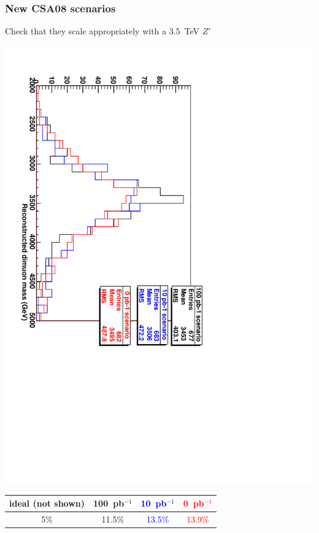 \documentclass[compress]{beamer}
\begin{document}
\begin{frame}
\frametitle{New CSA08 scenarios}

\vspace{0.5 cm}
Check that they scale appropriately with a 3.5~TeV $Z'$

\begin{center}
\includegraphics[height=0.8\linewidth, angle=90]{newscenarios_zprimetest.pdf}

\vspace{0.5 cm}
\begin{tabular}{c c c c}
ideal (not shown) & 100~pb$^{-1}$ & \textcolor{blue}{10~pb$^{-1}$} & \textcolor{red}{0~pb$^{-1}$} \\\hline
5\% & 11.5\% & \textcolor{blue}{13.5\%} & \textcolor{red}{13.9\%}
\end{tabular}

\end{center}
\end{frame}
\end{document}
